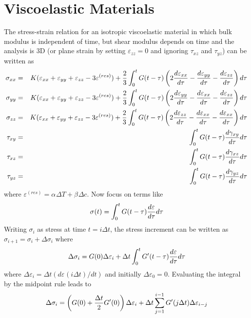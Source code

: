 \documentclass[11pt]{article}
\def\a#1{\alpha_{#1}}
\def\b#1{\beta_{#1}}
\def\DT{\Delta T}
\def\e#1{\varepsilon_{#1}}
\def\er#1{\varepsilon_{#1}^{(res)}}
\def\g#1{\gamma_{#1}}
\def\s#1{\sigma_{#1}}
\def\t#1{\tau_{#1}}
\begin{document}
\section{Viscoelastic Materials}

The stress-strain relation for an isotropic viscoelastic material in which bulk modulus is independent of time, but shear modulus depends on time and the analysis is 3D (or plane strain by setting $\e{zz}=0$ and ignoring $\t{xz}$ and $\t{yz}$) can be written as
\begin{eqnarray}
      \s{xx} & = & K(\e{xx} + \e{yy} + \e{zz} - 3\er{}) + {2\over 3}\int_0^t G(t-\tau)
                           \left(2 {d\e{xx}\over d\tau} -  {d\e{yy}\over d\tau} - {d\e{zz}\over d\tau}\right) d\tau \\
      \s{yy} & = & K(\e{xx} + \e{yy} + \e{zz} - 3\er{}) + {2\over 3}\int_0^t G(t-\tau)
                           \left(2 {d\e{yy}\over d\tau} -  {d\e{xx}\over d\tau} - {d\e{zz}\over d\tau}\right) d\tau \\
      \s{zz} & = & K(\e{xx} + \e{yy} + \e{zz} - 3\er{}) + {2\over 3}\int_0^t G(t-\tau)
                           \left(2 {d\e{zz}\over d\tau} - {d\e{xx}\over d\tau} -  {d\e{xx}\over d\tau}\right) d\tau \\
       \t{xy} & = & \int_0^t G(t-\tau) {d\g{xy}\over d\tau} d\tau \\
       \t{xz} & = & \int_0^t G(t-\tau) {d\g{xz}\over d\tau} d\tau \\
       \t{yz} & = & \int_0^t G(t-\tau) {d\g{yz}\over d\tau} d\tau
\end{eqnarray}
where $\er{} = \a{}\DT + \b{}\Delta c$.
Now focus on terms like
\begin{equation}
       \s{}(t) = \int_0^t G(t-\tau) {d\e{}\over d\tau} d\tau
\end{equation}
Writing $\s{i}$ as stress at time $t=i\Delta t$, the stress increment can be written as $\s{i+1}=\s{i}+\Delta \s{i}$ where
\begin{equation}
    \Delta \s{i} = G(0)\Delta \e{i} + \Delta t \int_0^t G'(t-\tau) {d\e{}\over d\tau} d\tau
\end{equation}
where $\Delta \e{i} = \Delta t (d\e{}(i\Delta t)/dt)$ and initially $\Delta \e{0}=0$. Evaluating the integral by the midpoint rule leads to
\begin{equation}
    \Delta \s{i} = \left(G(0) + {\Delta t\over 2}G'(0)\right)\Delta \e{i} 
                          + \Delta t \sum_{j=1}^{i-1} G'(j\Delta t)\Delta \e{i-j}
\end{equation}
\end{document}
